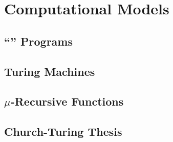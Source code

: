 \documentclass[english, 12pt]{article}
\begin{document}
  \section{Computational Models}
  \subsection{``\pC'' Programs}
  \subsection{Turing Machines}
  \subsection{$\mu$-Recursive Functions}
  \subsection{Church-Turing Thesis}
  
\end{document}
